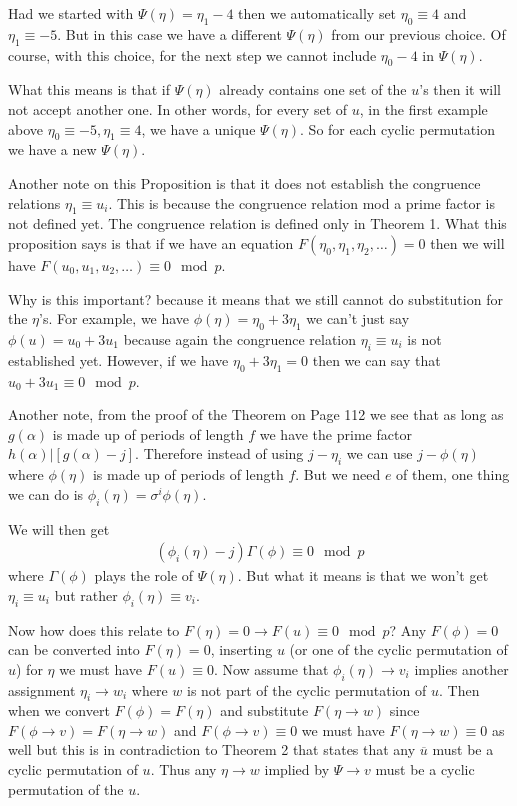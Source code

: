 \documentclass[aps,preprint,preprintnumbers,nofootinbib,showpacs,prd]{revtex4-1}
\newcommand{\nbea}{\begin{eqnarray*}}
\newcommand{\neea}{\end{eqnarray*}}
\begin{document}
Had we started with $\Psi(\eta) = \eta_1 - 4$ then we automatically set $\eta_0 \equiv 4$ and $\eta_1 \equiv -5$. But in this case we have a different $\Psi(\eta)$ from our previous choice. Of course, with this choice, for the next step we cannot include $\eta_0 - 4$ in $\Psi(\eta)$.

What this means is that if $\Psi(\eta)$ already contains one set of the $u$'s then it will not accept another one. In other words, for every set of $u$, in the first example above $\eta_0 \equiv -5, \eta_1 \equiv 4$, we have a unique $\Psi(\eta)$. So for each cyclic permutation we have a new $\Psi(\eta)$.

Another note on this Proposition is that it does not establish the congruence relations $\eta_1 \equiv u_i$. This is because the congruence relation mod a prime factor is not defined yet. The congruence relation is defined only in Theorem 1. What this proposition says is that if we have an equation $F(\eta_0, \eta_1, \eta_2, \dots) = 0$ then we will have $F(u_0, u_1, u_2, \dots) \equiv 0 \mod{p}$.

Why is this important? because it means that we still cannot do substitution for the $\eta$'s. For example, we have $\phi(\eta) = \eta_0 + 3\eta_1$ we can't just say $\phi(u) = u_0 + 3u_1$ because again the congruence relation $\eta_i \equiv u_i$ is not established yet. However, if we have $\eta_0 + 3\eta_1 = 0$ then we can say that $u_0 + 3u_1 \equiv 0 \mod{p}$.

Another note, from the proof of the Theorem on Page 112 we see that as long as $g(\alpha)$ is made up of periods of length $f$ we have the prime factor $h(\alpha)|[g(\alpha) - j]$. Therefore instead of using $j - \eta_i$ we can use $j - \phi(\eta)$ where $\phi(\eta)$ is made up of periods of length $f$. But we need $e$ of them, one thing we can do is $\phi_i(\eta) = \sigma^i \phi(\eta)$.

We will then get 
%
\nbea
(\phi_i(\eta) - j)\Gamma(\phi) \equiv 0 \mod{p}
\neea
%
where $\Gamma(\phi)$ plays the role of $\Psi(\eta)$. But what it means is that we won't get $\eta_i \equiv u_i$ but rather $\phi_i(\eta) \equiv v_i$.

Now how does this relate to $F(\eta) = 0 \to F(u) \equiv 0 \mod p$? Any $F(\phi) = 0$ can be converted into $F(\eta) = 0$, inserting $u$ (or one of the cyclic permutation of $u$) for $\eta$ we must have $F(u) \equiv 0$. Now assume that $\phi_i(\eta) \to v_i$ implies another assignment $\eta_i \to w_i$ where $w$ is not part of the cyclic permutation of $u$. Then when we convert $F(\phi) = F(\eta)$ and substitute $F(\eta \to w)$ since $F(\phi \to v) = F(\eta \to w)$ and $F(\phi \to v) \equiv 0$ we must have $F(\eta \to w) \equiv 0$ as well but this is in contradiction to Theorem 2 that states that any $\overline u$ must be a cyclic permutation of $u$. Thus any $\eta \to w$ implied by $\Psi \to v$ must be a cyclic permutation of the $u$.
\end{document}

